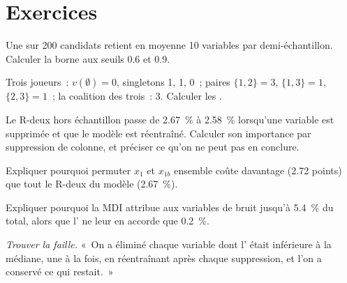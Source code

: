 \section{Exercices}

\begin{exercise}[$\star$]\label{exo:ml:feature-engineering-selection-and-importance:1}
Une  sur 200 candidats retient en moyenne 10 variables par demi-échantillon. Calculer la borne aux seuils
0.6 et 0.9.
\end{exercise}

\begin{exercise}[$\star$]\label{exo:ml:feature-engineering-selection-and-importance:2}
Trois joueurs~: $v(\emptyset) = 0$, singletons 1, 1, 0~; paires $\{1,2\} = 3$, $\{1,3\} = 1$, $\{2,3\} = 1$~; la coalition des trois~: 3.
Calculer les .
\end{exercise}

\begin{exercise}[$\star$]\label{exo:ml:feature-engineering-selection-and-importance:3}
Le R-deux hors échantillon passe de 2.67~\% à 2.58~\% lorsqu'une variable est supprimée et que le modèle est réentraîné. Calculer son importance par suppression de
colonne, et préciser ce qu'on ne peut pas en conclure.
\end{exercise}

\begin{exercise}[$\star\star$]\label{exo:ml:feature-engineering-selection-and-importance:4}
Expliquer pourquoi permuter $x_1$ et $x_{1b}$ ensemble coûte davantage (2.72 points) que tout le R-deux du modèle (2.67~\%).
\end{exercise}

\begin{exercise}[$\star\star$]\label{exo:ml:feature-engineering-selection-and-importance:5}
Expliquer pourquoi la MDI attribue aux variables de bruit jusqu'à 5.4~\% du total, alors que l' ne leur en accorde que 0.2~\%.
\end{exercise}

\begin{exercise}[$\star\star$]\label{exo:ml:feature-engineering-selection-and-importance:6}
\emph{Trouver la faille.} «~On a éliminé chaque variable dont l' était inférieure à la médiane, une à la fois,
en réentraînant après chaque suppression, et l'on a conservé ce qui restait.~»
\end{exercise}

